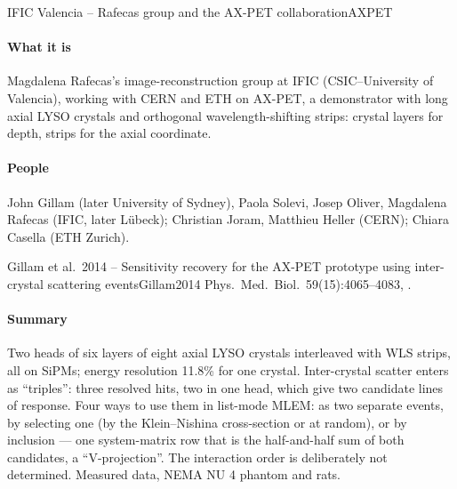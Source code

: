 \begin{programnote}{IFIC Valencia -- Rafecas group and the AX-PET collaboration}{AXPET}

\paragraph{What it is}
Magdalena Rafecas's image-reconstruction group at IFIC (CSIC--University of
Valencia), working with CERN and ETH on AX-PET, a demonstrator with long axial
LYSO crystals and orthogonal wavelength-shifting strips: crystal layers for
depth, strips for the axial coordinate.

\paragraph{People}
John Gillam (later University of Sydney), Paola Solevi, Josep Oliver, Magdalena
Rafecas (IFIC, later Lübeck); Christian Joram, Matthieu Heller (CERN); Chiara
Casella (ETH Zurich).

\begin{papernote}{Gillam et al.\ 2014 -- Sensitivity recovery for the AX-PET prototype using inter-crystal scattering events}{Gillam2014}
Phys.\ Med.\ Biol.\ 59(15):4065--4083, .

\paragraph{Summary}
Two heads of six layers of eight  axial LYSO
crystals interleaved with WLS strips, all on SiPMs; energy resolution 11.8\%
for one crystal. Inter-crystal scatter enters as ``triples'': three resolved
hits, two in one head, which give two candidate lines of response. Four ways
to use them in list-mode MLEM: as two separate events, by selecting one (by the
Klein--Nishina cross-section or at random), or by inclusion --- one system-matrix
row that is the half-and-half sum of both candidates, a ``V-projection''. The
interaction order is deliberately not determined. Measured data, NEMA NU 4
phantom and rats.


\end{papernote}
\end{programnote}
